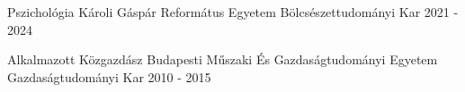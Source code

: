 

\begin{cventries}

   \cventry
    {Pszichológia} %
    {Károli Gáspár Református Egyetem} %
    {Bölcsészettudományi Kar} %
    {2021 - 2024} %
    {
    } 
  \vspace{-2.0mm}
  
  \cventry
    {Alkalmazott Közgazdász} %
    {Budapesti Műszaki És Gazdaságtudományi Egyetem} %
    {Gazdaságtudományi Kar} %
    {2010 - 2015} %
    {
    }
  \vspace{-2.0mm}
  
\end{cventries}
